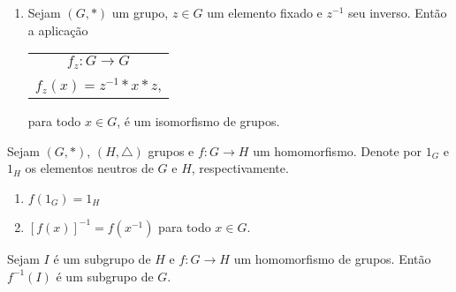 \documentclass{beamer}
\begin{document}
    \begin{frame}
        \begin{exemplos}
            \begin{enumerate}[label={\arabic*})]
                \conti

                \item Sejam $(G, \ast )$ um grupo, \pause $z\in G$ um elemento fixado \pause e $z^{-1}$ seu inverso. \pause Então a aplicação\pause
                \begin{center}
                    \begin{tabular}{c}
                        $f_z: G\to G$\pause\\
                        $f_z(x) = z^{-1}*x*z$,\pause
                    \end{tabular}
                \end{center}
                 para todo $x \in G$, é um isomorfismo de grupos.
            \end{enumerate}
            \vspace{.5cm}
        \end{exemplos}
    \end{frame}

    \begin{frame}
        \begin{proposicao}
            Sejam $(G, \ast )$, \pause $(H, \triangle)$ grupos \pause e $f : G \to H$ um homomorfismo. \pause Denote por $1_G$ \pause e $1_H$ \pause os elementos neutros de $G$ e $H$, \pause respectivamente.\pause
            \vspace{.5cm}
            \begin{enumerate}[label={\roman*})]
                \item $f(1_G) = 1_H$\pause

                \vspace{.5cm}

                \item $[f(x)]^{-1} = f(x^{-1})$ \pause para todo $x \in G$.
                \vspace{.5cm}
            \end{enumerate}
        \end{proposicao}
    \end{frame}

    \begin{frame}
        \begin{proposicao}
            Sejam $I$ é um subgrupo de $H$ \pause e $f : G \to H$ \pause um homomorfismo de grupos. \pause Então $f^{-1}(I)$ \pause é um subgrupo de $G$.
        \end{proposicao}

        \vspace{2cm}
    \end{frame}
\end{document}
